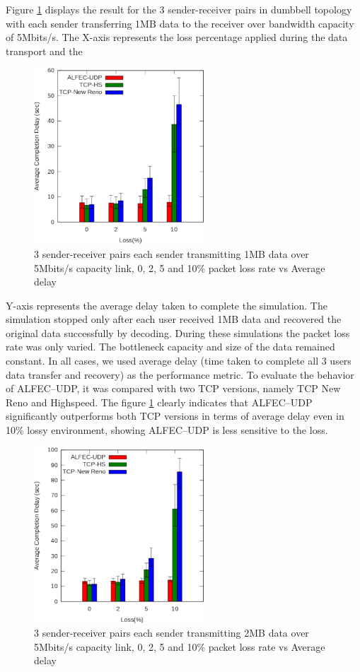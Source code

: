 Figure \ref{r1} displays the result for the 3 sender-receiver pairs in dumbbell topology with each sender transferring 1MB data to the receiver over bandwidth capacity of 5Mbits/s. The X-axis represents the loss percentage applied during the data transport and the
\begin{figure}[htbp] 
\begin{center}
\includegraphics[width=2.5in]{Figures/res1}
\caption{3 sender-receiver pairs each sender transmitting 1MB data over 5Mbits/s capacity link, 0, 2, 5 and 10\% packet loss rate vs Average delay}
\label{r1}
\end{center}
\end{figure}
\noindent
Y-axis represents the average delay taken to complete the simulation. The simulation stopped only after each user received 1MB data and recovered the original data successfully by decoding. During these simulations the packet loss rate was only varied. The bottleneck capacity and size of the data remained constant. In all cases, we used average delay (time taken to complete all 3 users data transfer and recovery) as the performance metric. To evaluate the behavior of ALFEC--UDP, it was compared with two TCP versions, namely TCP New Reno and Highspeed. The figure \ref{r1} clearly indicates that ALFEC--UDP significantly outperforms both TCP versions in terms of average delay even in 10\% lossy environment, showing ALFEC--UDP is less sensitive to the loss.
\begin{figure}[htbp]
\begin{center}
\includegraphics[width=2.5in]{Figures/res2}
\caption{3 sender-receiver pairs each sender transmitting 2MB data over 5Mbits/s capacity link, 0, 2, 5 and 10\% packet loss rate vs Average delay}
\label{r2}
\end{center}
\end{figure}
